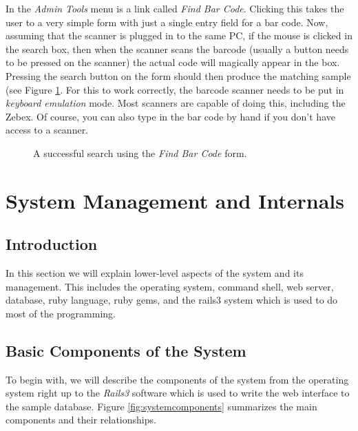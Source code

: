 \documentclass[12pt,twoside]{article}
\begin{document}
In the \emph{Admin Tools} menu is a link called \emph{Find Bar Code}.
Clicking this takes the user to a very simple form with just a single
entry field for a bar code. Now, assuming that the scanner is plugged in to
the same PC, if the mouse is clicked in the search box, then when the
scanner scans the barcode (usually a button needs to be pressed on the 
scanner) the actual code will magically appear in the box. Pressing
the search button on the form should then produce the matching sample
(see Figure \ref{fig:barcodeform}. 
For this to work correctly, the
barcode scanner needs to be put in \emph{keyboard emulation} mode.
Most scanners are capable of doing this, including the Zebex.
Of course, you can also type in the bar code by hand if you don't
have access to a scanner.

\begin{figure}[!htb]
\begin{center}
\caption{A successful search using the \emph{Find Bar Code} form.
\label{fig:barcodeform}}
\end{center}
\end{figure}

\section{System Management and Internals}
\subsection{Introduction}
In this section we will explain lower-level aspects of the system
and its management.
This includes the operating system, command shell, web server, 
database, ruby language, ruby gems, and the rails3 system which is
used to do most of the programming.

\subsection{Basic Components of the System}
To begin with, we will describe the components of the system from the
operating system right up to the \emph{Rails3} software which is used
to write the web interface to the sample database.
Figure \ref{fig:systemcomponents} summarizes the main components and
their relationships.
\end{document}
